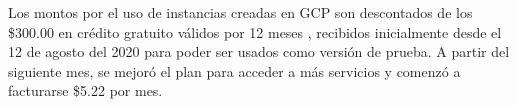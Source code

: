 Los montos por el uso de instancias creadas en GCP son descontados de los \$300.00 en crédito gratuito válidos por 12 meses \parencite{ot_googlecloud_freetrial}, recibidos inicialmente desde el 12 de agosto del 2020 para poder ser usados como versión de prueba. A partir del siguiente mes, se mejoró el plan para acceder a más servicios y comenzó a facturarse \$5.22 por mes.
